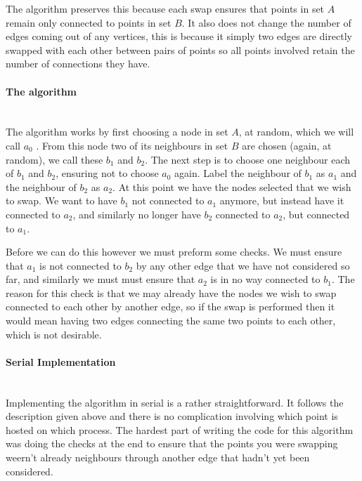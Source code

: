 \documentclass[pdftex,12pt,a4paper]{article}
\begin{document}
The algorithm preserves this because each swap ensures that points in set $A$ remain only connected to points in set $B$. It also does not change the number of edges coming out of any vertices, this is because it simply two edges are directly swapped with each other between pairs of points so all points involved retain the number of connections they have.

\paragraph{The algorithm} ~\\

The algorithm works by first choosing a node in set $A$, at random, which we will call $a_0$ . From this node two of its neighbours in set $B$ are chosen (again, at random), we call these $b_1$ and $b_2$. The next step is to choose one neighbour each of $b_1$ and $b_2$, ensuring not to choose $a_0$ again. Label the neighbour of $b_1$ as $a_1$ and the neighbour of $b_2$ as $a_2$. At this point we have the nodes selected that we wish to swap. We want to have $b_1$ not connected to $a_1$ anymore, but instead have it connected to $a_2$, and similarly no longer have $b_2$ connected to $a_2$, but connected to $a_1$.

Before we can do this however we must preform some checks. We must ensure that $a_1$ is not connected to $b_2$ by any other edge that we have not considered so far, and similarly we must must ensure that $a_2$ is in no way connected to $b_1$. The reason for this check is that we may already have the nodes we wish to swap connected to each other by another edge, so if the swap is performed then it would mean having two edges connecting the same two points to each other, which is not desirable.



\paragraph{Serial Implementation} ~\\

Implementing the algorithm in serial is a rather straightforward. It follows the description given above and there is no complication involving which point is hosted on which process. The hardest part of writing the code for this algorithm was doing the checks at the end to ensure that the points you were swapping weern't already neighbours through another edge that hadn't yet been considered.
\end{document}
